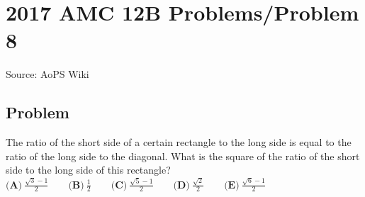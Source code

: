 \documentclass[12pt]{article}
\begin{document}
\section*{{2017 AMC 12B Problems/Problem 8}}
Source: AoPS Wiki

\subsection*{Problem}
The ratio of the short side of a certain rectangle to the long side is equal to the ratio of the long side to the diagonal. What is the square of the ratio of the short side to the long side of this rectangle? $\textbf{(A)}\ \frac{\sqrt{3}-1}{2}\qquad\textbf{(B)}\ \frac{1}{2}\qquad\textbf{(C)}\ \frac{\sqrt{5}-1}{2} \qquad\textbf{(D)}\ \frac{\sqrt{2}}{2} \qquad\textbf{(E)}\ \frac{\sqrt{6}-1}{2}$
\end{document}
